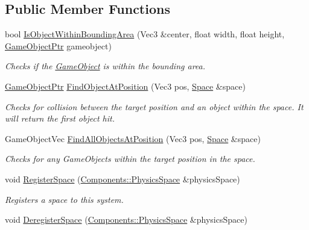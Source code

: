\subsection*{Public Member Functions}
\begin{DoxyCompactItemize}
\item 
bool \hyperlink{classDCEngine_1_1Systems_1_1Physics_a3daa73f077ed81bb74ac7e19a2143921}{Is\-Object\-Within\-Bounding\-Area} (Vec3 \&center, float width, float height, \hyperlink{classDCEngine_1_1GameObject}{Game\-Object\-Ptr} gameobject)
\begin{DoxyCompactList}\small\item\em Checks if the \hyperlink{classDCEngine_1_1GameObject}{Game\-Object} is within the bounding area. \end{DoxyCompactList}\item 
\hyperlink{classDCEngine_1_1GameObject}{Game\-Object\-Ptr} \hyperlink{classDCEngine_1_1Systems_1_1Physics_a786d02f2a6521108c37ac5918865f552}{Find\-Object\-At\-Position} (Vec3 pos, \hyperlink{classDCEngine_1_1Space}{Space} \&space)
\begin{DoxyCompactList}\small\item\em Checks for collision between the target position and an object within the space. It will return the first object hit. \end{DoxyCompactList}\item 
Game\-Object\-Vec \hyperlink{classDCEngine_1_1Systems_1_1Physics_accee13b6fdc523a6bcf346b3ce50e0bb}{Find\-All\-Objects\-At\-Position} (Vec3 pos, \hyperlink{classDCEngine_1_1Space}{Space} \&space)
\begin{DoxyCompactList}\small\item\em Checks for any Game\-Objects within the target position in the space. \end{DoxyCompactList}\item 
void \hyperlink{classDCEngine_1_1Systems_1_1Physics_a728b4c64d2f7e9a371c7618745fab814}{Register\-Space} (\hyperlink{classDCEngine_1_1Components_1_1PhysicsSpace}{Components\-::\-Physics\-Space} \&physics\-Space)
\begin{DoxyCompactList}\small\item\em Registers a space to this system. \end{DoxyCompactList}\item 
void \hyperlink{classDCEngine_1_1Systems_1_1Physics_ab0e5409ce0a9b929d435ca59944db2cc}{Deregister\-Space} (\hyperlink{classDCEngine_1_1Components_1_1PhysicsSpace}{Components\-::\-Physics\-Space} \&physics\-Space)

\end{DoxyCompactItemize}

